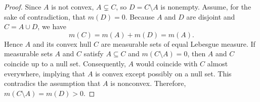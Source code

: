 \documentclass[12pt]{article}
\newtheorem{lemma}{Lemma}
\theoremstyle{definition}
\theoremstyle{remark}
\begin{document}
\begin{proof}
Since $A$ is not convex, $A \subsetneq C$, so $D = C \setminus A$ is nonempty. Assume, for the sake of contradiction, that $m(D) = 0$. Because $A$ and $D$ are disjoint and $C = A \cup D$, we have
\[
m(C) = m(A) + m(D) = m(A).
\]
Hence $A$ and its convex hull $C$ are measurable sets of equal Lebesgue measure. If measurable sets $A$ and $C$ satisfy $A \subseteq C$ and $m(C \setminus A)=0$, then $A$ and $C$ coincide up to a null set. Consequently, $A$ would coincide with $C$ almost everywhere, implying that $A$ is convex except possibly on a null set. This contradics the assumption that $A$ is nonconvex. Therefore, $m(C \setminus A) = m(D) > 0$.
\end{proof}







\end{document}
